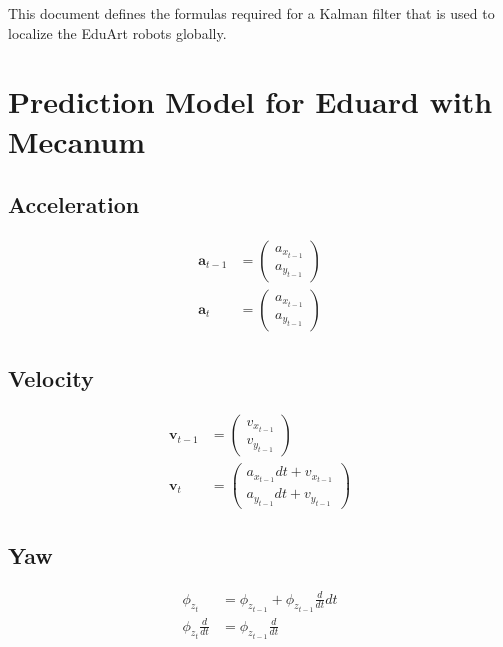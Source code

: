 \documentclass{article}
\begin{document}
This document defines the formulas required for a Kalman filter that is used to localize the EduArt robots globally.

\section{Prediction Model for Eduard with Mecanum}

\subsection{Acceleration}
\begin{align}
  \textbf{a}_{t-1} &= \left(\begin{matrix}a_{x_{t-1}}\\a_{y_{t-1}}\end{matrix}\right) \\
  \textbf{a}_t &= \left(\begin{matrix}a_{x_{t-1}}\\a_{y_{t-1}}\end{matrix}\right)
\end{align}

\subsection{Velocity}
\begin{align}
  \textbf{v}_{t-1} &= \left(\begin{matrix}v_{x_{t-1}}\\v_{y_{t-1}}\end{matrix}\right) \\
  \textbf{v}_t &= \left(\begin{matrix}a_{x_{t-1}} dt + v_{x_{t-1}}\\a_{y_{t-1}} dt + v_{y_{t-1}}\end{matrix}\right)
\end{align}

\subsection{Yaw}
\begin{align}
  \phi_{z_t} &= \phi_{z_{t-1}} + \phi_{z_{t-1}}\frac{d}{dt} dt \\
  \phi_{z_t}\frac{d}{dt} &= \phi_{z_{t-1}}\frac{d}{dt}
\end{align}
\end{document}
